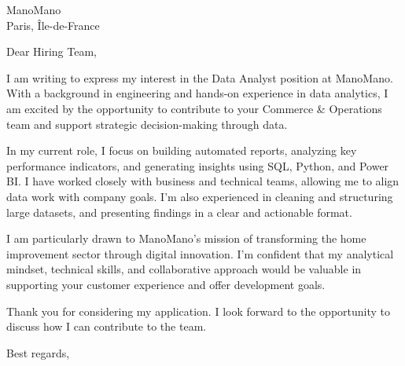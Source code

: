 \documentclass[a4paper,10pt]{letter}
\begin{document}
\begin{letter}{ManoMano\\ Paris, Île-de-France}

\opening{Dear Hiring Team,}

I am writing to express my interest in the Data Analyst position at ManoMano. With a background in engineering and hands-on experience in data analytics, I am excited by the opportunity to contribute to your Commerce \& Operations team and support strategic decision-making through data.

In my current role, I focus on building automated reports, analyzing key performance indicators, and generating insights using SQL, Python, and Power BI. I have worked closely with business and technical teams, allowing me to align data work with company goals. I'm also experienced in cleaning and structuring large datasets, and presenting findings in a clear and actionable format.

I am particularly drawn to ManoMano's mission of transforming the home improvement sector through digital innovation. I'm confident that my analytical mindset, technical skills, and collaborative approach would be valuable in supporting your customer experience and offer development goals.

Thank you for considering my application. I look forward to the opportunity to discuss how I can contribute to the team.

\closing{Best regards,}

\signature{Pietro Gazzi}

\end{letter}
\end{document}
